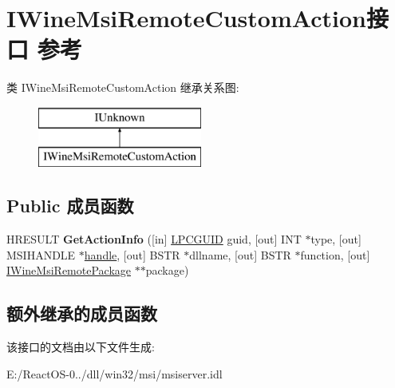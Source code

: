\hypertarget{interface_i_wine_msi_remote_custom_action}{}\section{I\+Wine\+Msi\+Remote\+Custom\+Action接口 参考}
\label{interface_i_wine_msi_remote_custom_action}
类 I\+Wine\+Msi\+Remote\+Custom\+Action 继承关系图\+:\begin{figure}[H]
\begin{center}
\leavevmode
\includegraphics[height=2.000000cm]{interface_i_wine_msi_remote_custom_action}
\end{center}
\end{figure}
\subsection*{Public 成员函数}
\begin{DoxyCompactItemize}
\item 
\mbox{\label{interface_i_wine_msi_remote_custom_action_a685c233224e480913bc53744223b32ad}} 
H\+R\+E\+S\+U\+LT {\bfseries Get\+Action\+Info} (\mbox{[}in\mbox{]} \hyperlink{interface_g_u_i_d}{L\+P\+C\+G\+U\+ID} guid, \mbox{[}out\mbox{]} I\+NT $\ast$type, \mbox{[}out\mbox{]} M\+S\+I\+H\+A\+N\+D\+LE $\ast$\hyperlink{structhandle}{handle}, \mbox{[}out\mbox{]} B\+S\+TR $\ast$dllname, \mbox{[}out\mbox{]} B\+S\+TR $\ast$function, \mbox{[}out\mbox{]} \hyperlink{interface_i_wine_msi_remote_package}{I\+Wine\+Msi\+Remote\+Package} $\ast$$\ast$package)
\end{DoxyCompactItemize}
\subsection*{额外继承的成员函数}


该接口的文档由以下文件生成\+:\begin{DoxyCompactItemize}
\item 
E\+:/\+React\+O\+S-\/0../dll/win32/msi/msiserver.\+idl\end{DoxyCompactItemize}

